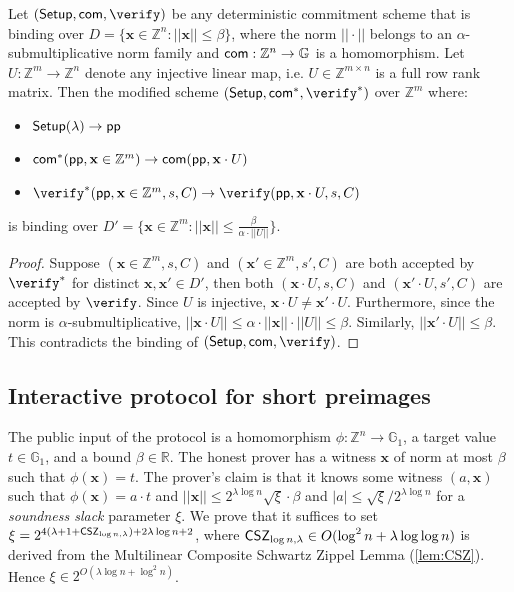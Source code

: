 \begin{lemma}
 Let $(\setup, \com, \verify)$ be any deterministic commitment scheme that is binding over $D = \{\mathbf{x} \in \mathbb{Z}^n: ||\mathbf{x}|| \leq \beta \}$, where the norm $|| \cdot ||$ belongs to an $\alpha$-submultiplicative norm family and $\com: \mathbb{Z}^n \rightarrow \mathbb{G}$ is a homomorphism. %
Let $U: \mathbb{Z}^m \rightarrow \mathbb{Z}^n$ denote any injective linear map, i.e. $U \in \mathbb{Z}^{m \times n}$ is a full row rank matrix. Then the modified scheme $(\setup, \com^*, \verify^*)$ over $\mathbb{Z}^m$ where: 
\begin{itemize}
\item $\setup(\lambda) \rightarrow \params$
\item $\com^*(\params, \mathbf{x} \in \mathbb{Z}^m) \rightarrow  \com(\params, \mathbf{x} \cdot U)$
\item $\verify^*(\params, \mathbf{x} \in \mathbb{Z}^m, s, C) \rightarrow \verify(\params, \mathbf{x} \cdot U, s, C)$ 
\end{itemize}
is binding over $D' = \{\mathbf{x} \in \mathbb{Z}^m: ||\mathbf{x}|| \leq \frac{\beta}{\alpha\cdot||U||} \}$. 
\end{lemma}
\begin{proof} 
Suppose $(\mathbf{x} \in \mathbb{Z}^m, s, C)$ and $(\mathbf{x}' \in \mathbb{Z}^m, s', C)$ are both accepted by $\verify^*$ for distinct $\mathbf{x}, \mathbf{x}' \in D'$, then both $(\mathbf{x} \cdot U, s, C)$ and $(\mathbf{x}' \cdot U, s', C)$ are accepted by $\verify$. Since $U$ is injective, $\mathbf{x} \cdot U \neq \mathbf{x}' \cdot U$. Furthermore, since the norm is $\alpha$-submultiplicative, $||\mathbf{x} \cdot U|| \leq \alpha \cdot ||\mathbf{x}|| \cdot ||U|| \leq  \beta$. Similarly, $||\mathbf{x}' \cdot U || \leq \beta$. This contradicts the binding of $(\setup, \com, \verify)$. 
\end{proof}

\subsection{Interactive protocol for short preimages} 

The public input of the protocol is a homomorphism $\phi: \mathbb{Z}^n \rightarrow \mathbb{G}_1$, a target value $t \in \mathbb{G}_1$, and a bound $\beta \in \mathbb{R}$. The honest prover has a witness $\mathbf{x}$ of norm at most $\beta$ such that $\phi(\mathbf{x}) = t$. The prover's claim is that it knows some witness $(a, \mathbf{x})$ such that $\phi(\mathbf{x}) = a \cdot t$ and $||\mathbf{x}|| \leq 2^{\lambda \log n} \sqrt{\xi} \cdot \beta$ and $|a| \leq \sqrt{\xi}/2^{\lambda \log n}$ for a \emph{soundness slack} parameter $\xi$. We prove that it suffices to set $\xi = 2^{4(\lambda + 1 + \CSZ[\log n]) + 2 \lambda \log n + 2}$, where $\CSZ[\log n] \in O(\log^2 n + \lambda \log \log n)$ is derived from the Multilinear Composite Schwartz Zippel Lemma (\cref{lem:CSZ}). Hence $\xi \in 2^{O(\lambda \log n + \log^2 n)}$. 


